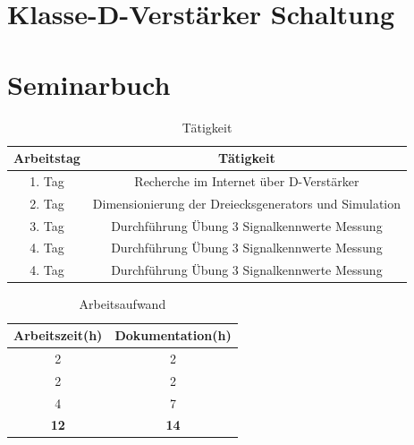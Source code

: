 \documentclass[11pt,a4paper,bibtotoc,oneside]{scrbook}
\begin{document}
\chapter{Klasse-D-Verstärker Schaltung}


\chapter{Seminarbuch}
\begin{table}[htbp]
  \centering
  \captionsetup{margin=1pt,font=small,labelfont=bf}
  \caption{Tätigkeit}
    \begin{tabular}{| c | c| }\hline
    {\bf Arbeitstag} &{\bf Tätigkeit} \\\hline
    \hline
    1. Tag   & Recherche im Internet über D-Verstärker  \\
    2. Tag   & Dimensionierung der Dreiecksgenerators und Simulation \\
    3. Tag   & Durchführung Übung 3 Signalkennwerte Messung  \\
    4. Tag   & Durchführung Übung 3 Signalkennwerte Messung  \\
    4. Tag   & Durchführung Übung 3 Signalkennwerte Messung  \\
    \hline
    \end{tabular}%
  \label{tab:addlabel}%
\end{table}%
\begin{table}[htbp]
  \centering
    \captionsetup{margin=1pt,font=small,labelfont=bf}
      \caption{Arbeitsaufwand}
      \begin{tabular}{| c | c |}\hline
      {\bf Arbeitszeit(h)} &{\bf Dokumentation(h)} \\\hline
      \hline
        2   & 2 \\
        2   & 2 \\
        4   & 7 \\
      \hline
        \textbf{12}   & \textbf{14} \\
      \hline
      \end{tabular}%
    \label{tab:addlabel}%
\end{table}%






\restoregeometry




%
\end{document}
